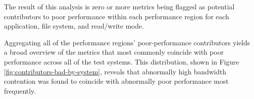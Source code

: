 The result of this analysis is zero or more metrics being flagged as potential contributors to poor performance within each performance region for each application, file system, and read/write mode.

Aggregating all of the performance regions' poor-performance contributors yields a broad overview of the metrics that most commonly coincide with poor performance across all of the test systems.
This distribution, shown in Figure \ref{fig:contributors-bad-by-system}, reveals that abnormally high bandwidth contention was found to coincide with abnormally poor performance most frequently.



